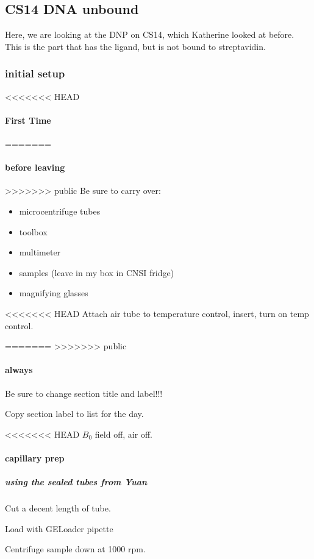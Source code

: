 \subsection{CS14 DNA unbound}\label{sec:dna_cs14_unbounddna}
\timeblockstart
{}
Here, we are looking at the DNP on CS14, which Katherine looked at before.
This is the part that has the ligand, but is not bound to streptavidin.

\subsubsection{initial setup}
<<<<<<< HEAD
\paragraph{First Time}
=======
\paragraph{before leaving}
>>>>>>> public
Be sure to carry over:
\begin{itemize}
    \item microcentrifuge tubes
    \item toolbox 
    \item multimeter 
    \item samples (leave in my box in CNSI fridge)
    \item magnifying glasses
\end{itemize}

<<<<<<< HEAD
Attach air tube to temperature control, insert, turn on temp control.

=======
>>>>>>> public
\paragraph{always}
Be sure to change section title and label!!!

Copy section label to list for the day.

<<<<<<< HEAD
$B_0$ field off, air off.

\paragraph{capillary prep}
\subparagraph{using the sealed tubes from Yuan}

Cut a decent length of tube.

Load with GELoader pipette

Centrifuge sample down at 1000 rpm.

